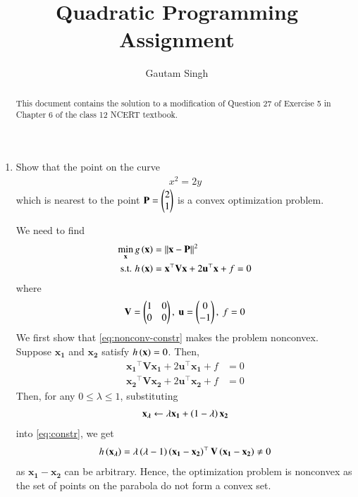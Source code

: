 \documentclass[journal,12pt,twocolumn]{IEEEtran}
\renewcommand{\vec}[1]{\boldsymbol{\mathbf{#1}}}
\begin{document}
\vspace{3cm}
\title{Quadratic Programming Assignment}
\author{Gautam Singh}
\maketitle
\bigskip

\begin{abstract}
    This document contains the solution to a modification of Question 27 of 
    Exercise 5 in Chapter 6 of the class 12 NCERT textbook.
\end{abstract}

\begin{enumerate}
    \item Show that the point on the curve 
    \begin{align}
        x^2 = 2y
        \label{eq:curve}
    \end{align}
    which is nearest to the point $\vec{P} = \myvec{2\\1}$ is a convex
    optimization problem.

    \solution We need to find
    \begin{align}
        \min_{\vec{x}} g\brak{\vec{x}} &= \norm{\vec{x}-\vec{P}}^2 \\
        \textrm{s.t. } h\brak{\vec{x}} &= \vec{x}^\top\vec{Vx} + 2\vec{u}^\top\vec{x} + f = 0 \label{eq:nonconv-constr}
    \end{align}
    where
    \begin{align}
        \vec{V} = \myvec{1&0\\0&0},\ \vec{u} = \myvec{0\\-1},\ f = 0
    \end{align}
    We first show that \eqref{eq:nonconv-constr} makes the problem nonconvex.
    Suppose $\vec{x_1}$ and $\vec{x_2}$ satisfy $h\brak{\vec{x}} = 0$. Then,
    \begin{align}
        \vec{x_1}^\top\vec{Vx_1} + 2\vec{u}^\top\vec{x_1} + f &= 0 \label{eq:x1-parab} \\
        \vec{x_2}^\top\vec{Vx_2} + 2\vec{u}^\top\vec{x_2} + f &= 0 \label{eq:x2-parab}
    \end{align}
    Then, for any $0 \le \lambda \le 1$, substituting
    \begin{align}
        \vec{x_\lambda} \leftarrow \lambda\vec{x_1} + \brak{1-\lambda}\vec{x_2}
    \end{align}
    into \eqref{eq:constr}, we get
    \begin{align}
        h\brak{\vec{x_\lambda}} = \lambda\brak{\lambda-1}\brak{\vec{x_1}-\vec{x_2}}^\top\vec{V}\brak{\vec{x_1}-\vec{x_2}} \neq 0
        \label{eq:nonconvex}
    \end{align}
    as $\vec{x_1} - \vec{x_2}$ can be arbitrary. Hence, the optimization 
    problem is nonconvex as the set of points on the parabola do not form a 
    convex set.


\end{enumerate}
\end{document}

